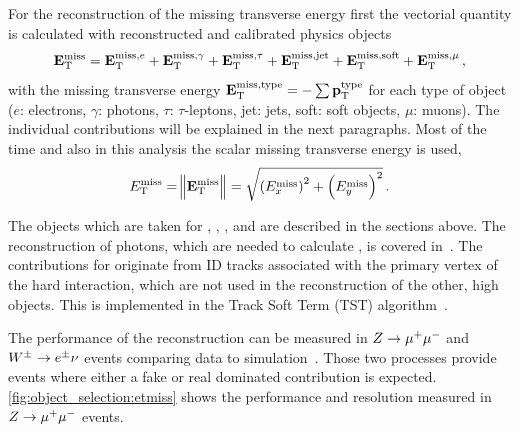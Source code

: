 For the reconstruction of the missing transverse energy first the vectorial quantity \etmissvec{} is calculated
with reconstructed and calibrated physics objects~\cite{ATL-PHYS-PUB-2015-023}
\begin{equation}
    \label{eq:met:vector}
    \mathbf{E}_\text{T}^\text{miss} = \mathbf{E}_\text{T}^{\text{miss},e} + \mathbf{E}_\text{T}^{\text{miss},\gamma} + \mathbf{E}_\text{T}^{\text{miss},\tau} + \mathbf{E}_\text{T}^{\text{miss},\text{jet}} + \mathbf{E}_\text{T}^{\text{miss},\text{soft}} + \mathbf{E}_\text{T}^{\text{miss},\mu} \,,
\end{equation}
with the missing transverse energy $\mathbf{E}_\text{T}^{\text{miss},\text{type}} = - \sum \mathbf{p}_\text{T}^\text{type}$ for each type of object
($e$: electrons, $\gamma$: photons, $\tau$: $\tau$-leptons, jet: jets, soft: soft objects, $\mu$: muons).
The individual contributions will be explained in the next paragraphs.
Most of the time and also in this analysis the scalar missing transverse energy \etmiss{} is used,
\begin{equation}
    \label{eq:met:scalar}
    E_\text{T}^\text{miss}{} = \norm{\mathbf{E}_\text{T}^\text{miss}{}} = \sqrt{{\left(E_x^\text{miss}\right)}^2 + {\left(E_y^\text{miss}\right)}^2} \,.
\end{equation}

The objects which are taken for , \etmissvecobj{\mu}, \etmissvecobj{\tau},
and  are described in the sections above.
The reconstruction of photons, which are needed to calculate \etmissvecobj{\gamma}, is covered in~\cite{PERF-2013-04}.
The contributions for  originate from  ID tracks associated with the primary vertex of the
hard interaction, which are not used in the reconstruction of the other, high \pt{} objects.
This is implemented in the Track Soft Term (TST) algorithm~\cite{ATL-PHYS-PUB-2015-023}.

The performance of the \etmiss{} reconstruction can be measured in $Z \to \mu^+\mu^-$ and $W^\pm \to e^\pm \nu$
events comparing data to simulation~\cite{ATL-PHYS-PUB-2015-027}.
Those two processes provide events where either a fake or real dominated \etmiss{} contribution is expected.
\cref{fig:object_selection:etmiss} shows the performance and resolution measured in $Z \to \mu^+\mu^-$ events.

